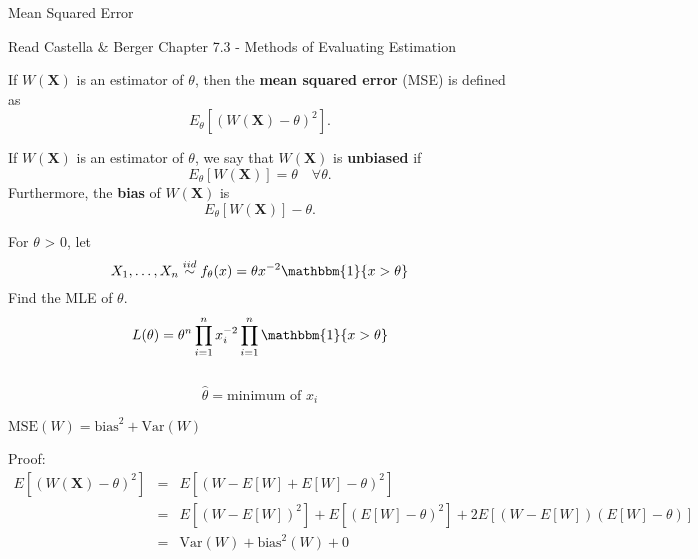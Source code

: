 \documentclass[11pt,fleqn]{book} %
\begin{document}
\begin{section}{Mean Squared Error}

\begin{remark} 
	Read Castella \& Berger Chapter 7.3 - Methods of Evaluating Estimation
\end{remark} 


\begin{definition}

If $W(\bm{X})$ is an estimator of $\theta$, then the \textbf{mean squared error} (MSE) is defined as
\[
	E_\theta\left[(W(\bm{X}) - \theta)^2\right].
\]

\end{definition}

\begin{definition}

If $W(\bm{X})$ is an estimator of $\theta$, we say that $W(\bm{X})$ is \textbf{unbiased} if
\[
	E_\theta[W(\bm{X})] = \theta \quad \forall \theta.
\]
Furthermore, the \textbf{bias} of $W(\bm{X})$ is
\[
	E_\theta[W(\bm{X})] - \theta.
\]

\end{definition}

\begin{example}
	For $\theta$ > 0, let
	$$
		X_1, \dots, X_n \stackrel{iid}{\sim} f_\theta(x)=\theta x^{-2} \mathbbm{1}\{x>\theta\}
	$$
Find the MLE of $\theta$.
$$
	L(\theta)=\theta^n \prod_{i=1}^n x_i^{-2} \prod_{i=1}^n \mathbbm{1}\{x>\theta\}$$
	\\
	$$\hat{\theta}=\text{minimum of }x_i
$$
\end{example}

\begin{theorem}
$\textrm{MSE}(W) = \textrm{bias}^2 + \textrm{Var}(W)$
\end{theorem}

Proof:
\begin{eqnarray*}
	E[(W(\bm{X})-\theta)^2] &=& E[(W-E[W]+E[W]-\theta)^2]\\
							&=& E[(W-E[W])^2]+E[(E[W]-\theta)^2]+2E[(W-E[W])(E[W]-\theta)]\\
							&=& \textrm{Var}(W) + \textrm{bias}^2(W) + 0
\end{eqnarray*}

\end{section}
\end{document}
